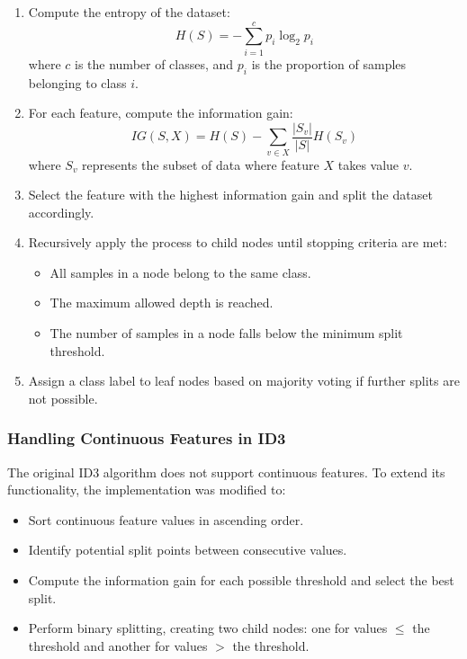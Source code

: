 \documentclass[12pt]{article}
\begin{document}
\begin{enumerate}
    \item Compute the entropy of the dataset:
    \begin{equation}
    H(S) = - \sum_{i=1}^{c} p_i \log_2 p_i
    \end{equation}
    where $c$ is the number of classes, and $p_i$ is the proportion of samples belonging to class $i$.

    \item For each feature, compute the information gain:
    \begin{equation}
    IG(S, X) = H(S) - \sum_{v \in X} \frac{|S_v|}{|S|} H(S_v)
    \end{equation}
    where $S_v$ represents the subset of data where feature $X$ takes value $v$.

    \item Select the feature with the highest information gain and split the dataset accordingly.

    \item Recursively apply the process to child nodes until stopping criteria are met:
    \begin{itemize}
        \item All samples in a node belong to the same class.
        \item The maximum allowed depth is reached.
        \item The number of samples in a node falls below the minimum split threshold.
    \end{itemize}

    \item Assign a class label to leaf nodes based on majority voting if further splits are not possible.
\end{enumerate}

\subsubsection{Handling Continuous Features in ID3}
The original ID3 algorithm does not support continuous features. To extend its functionality, the implementation was modified to:

\begin{itemize}
    \item Sort continuous feature values in ascending order.
    \item Identify potential split points between consecutive values.
    \item Compute the information gain for each possible threshold and select the best split.
    \item Perform binary splitting, creating two child nodes: one for values $\leq$ the threshold and another for values $>$ the threshold.
\end{itemize}
\end{document}
